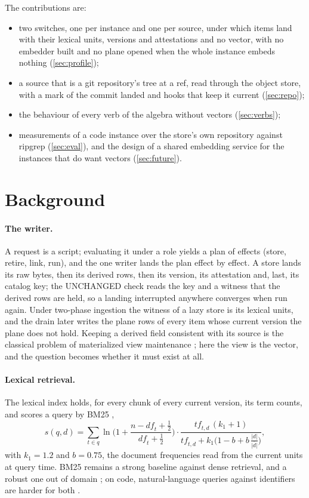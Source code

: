 \documentclass[11pt]{article}
\theoremstyle{plain}
\theoremstyle{definition}
\theoremstyle{remark}
\begin{document}
The contributions are:
\begin{itemize}
\item two switches, one per instance and one per source, under which items land with their lexical
units, versions and attestations and no vector, with no embedder built and no plane opened when the
whole instance embeds nothing (\cref{sec:profile});
\item a source that is a git repository's tree at a ref, read through the object store, with a mark
of the commit landed and hooks that keep it current (\cref{sec:repo});
\item the behaviour of every verb of the algebra without vectors (\cref{sec:verbs});
\item measurements of a code instance over the store's own repository against ripgrep
(\cref{sec:eval}), and the design of a shared embedding service for the instances that do want
vectors (\cref{sec:future}).
\end{itemize}

\section{Background}

\paragraph{The writer.} A request is a script; evaluating it under a role yields a plan of effects
(store, retire, link, run), and the one writer lands the plan effect by effect. A store lands its
raw bytes, then its derived rows, then its version, its attestation and, last, its catalog key;
the UNCHANGED check reads the key and a witness that the derived rows are held, so a landing
interrupted anywhere converges when run again. Under two-phase ingestion the witness of a lazy
store is its lexical units, and the drain later writes the plane rows of every item whose current
version the plane does not hold. Keeping a derived field consistent with its source is the
classical problem of materialized view maintenance \citep{gupta1995views}; here the view is the
vector, and the question becomes whether it must exist at all.

\paragraph{Lexical retrieval.} The lexical index holds, for every chunk of every current version,
its term counts, and scores a query by BM25 \citep{robertson2009bm25},
\begin{equation}
  s(q,d) = \sum_{t\in q} \ln\!\Big(1+\frac{n-\mathit{df}_t+\tfrac12}{\mathit{df}_t+\tfrac12}\Big)
  \cdot \frac{\mathit{tf}_{t,d}\,(k_1+1)}{\mathit{tf}_{t,d}+k_1\big(1-b+b\,\tfrac{|d|}{\overline{|d|}}\big)},
\end{equation}
with $k_1=1.2$ and $b=0.75$, the document frequencies read from the current units at query time.
BM25 remains a strong baseline against dense retrieval, and a robust one out of domain
\citep{karpukhin2020dpr,thakur2021beir}; on code, natural-language queries against identifiers are
harder for both \citep{husain2019codesearchnet}.
\end{document}
